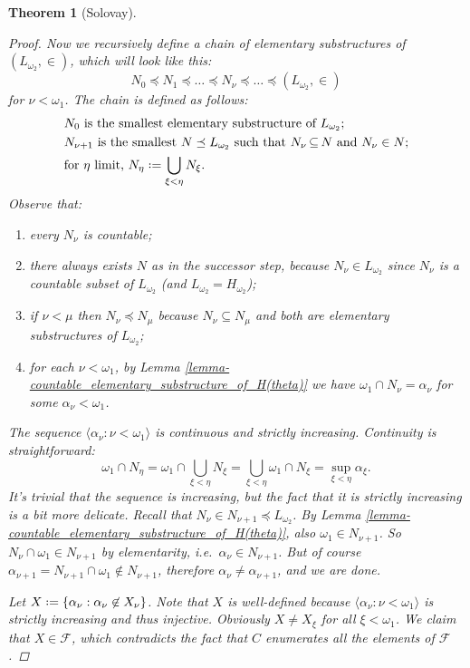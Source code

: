 \documentclass[11pt,a4paper]{report}
\newtheorem{theorem}{Theorem}[chapter] %
\theoremstyle{definition}
\theoremstyle{num.custom-title}
\theoremstyle{custom-title}
\DeclareMathOperator{\sse}{\subseteq}
\newcommand{\F}{\mathcal{F}}
\newcommand*{\defeq}{\mathrel{\rlap{%
                     \raisebox{0.3ex}{$\cdot$}}%
                     \raisebox{-0.3ex}{$\cdot$}}%
                     =}
\begin{document}
\begin{theorem}[Solovay]
\begin{proof}
Now we recursively define a chain of elementary substructures of $(L_{\omega_2},\in)$, which will look like this:
\[
N_0 \preceq N_1 \preceq \dots \preceq N_\nu \preceq \dots \preceq (L_{\omega_2},\in)
\]
for $\nu < \omega_1$. The chain is defined as follows: 
\begin{align}
& \text{$N_0$ is the smallest elementary substructure of $L_{\omega_2}$;}\\
& \text{$N_{\nu+1}$ is the smallest $N \preceq L_{\omega_2}$ such that $N_\nu \sse N$ and $N_\nu \in N$;} \nonumber \\
& \text{for $\eta$ limit, $N_\eta \defeq \bigcup_{\xi < \eta} N_\xi$.} \nonumber
\end{align}
Observe that:
\begin{enumerate}[--]
\item every $N_\nu$ is countable;
\item there always exists $N$ as in the successor step, because $N_\nu \in L_{\omega_2}$ since $N_\nu$ is a countable subset of $L_{\omega_2}$ (and $L_{\omega_2} = H_{\omega_2}$);
\item if $\nu < \mu$ then $N_\nu \preceq N_\mu$ because $N_\nu \sse N_\mu$ and both are elementary substructures of $L_{\omega_2}$;
\item for each $\nu < \omega_1$, by Lemma \ref{lemma-countable_elementary_substructure_of_H(theta)} we have $\omega_1 \cap N_\nu = \alpha_\nu$ for some $\alpha_\nu < \omega_1$.
\end{enumerate}
The sequence $\langle \alpha_\nu : \nu < \omega_1 \rangle$ is continuous and strictly increasing. Continuity is straightforward:
\[
\omega_1 \cap N_\eta = \omega_1 \cap \bigcup_{\xi < \eta} N_\xi = \bigcup_{\xi < \eta} \omega_1 \cap N_\xi = \sup_{\xi < \eta} \alpha_\xi.
\]
It's trivial that the sequence is increasing, but the fact that it is \emph{strictly} increasing is a bit more delicate. Recall that $N_\nu \in N_{\nu+1} \preceq L_{\omega_2}$. By Lemma \ref{lemma-countable_elementary_substructure_of_H(theta)}, also $\omega_1 \in N_{\nu+1}$. So $N_\nu \cap \omega_1 \in N_{\nu+1}$ by elementarity, i.e.\ $\alpha_\nu \in N_{\nu+1}$. But of course $\alpha_{\nu+1} = N_{\nu+1} \cap \omega_1 \not\in N_{\nu+1}$, therefore $\alpha_\nu \neq \alpha_{\nu+1}$, and we are done.

Let $X \defeq \{ \alpha_\nu : \alpha_\nu \not\in X_\nu \}$. Note that $X$ is well-defined because $\langle \alpha_\nu : \nu < \omega_1 \rangle$ is strictly increasing and thus injective. Obviously $X \neq X_\xi$ for all $\xi < \omega_1$. We claim that $X \in \F$, which contradicts the fact that $C$ enumerates all the elements of $\F$.


\end{proof}
\end{theorem}
\end{document}
